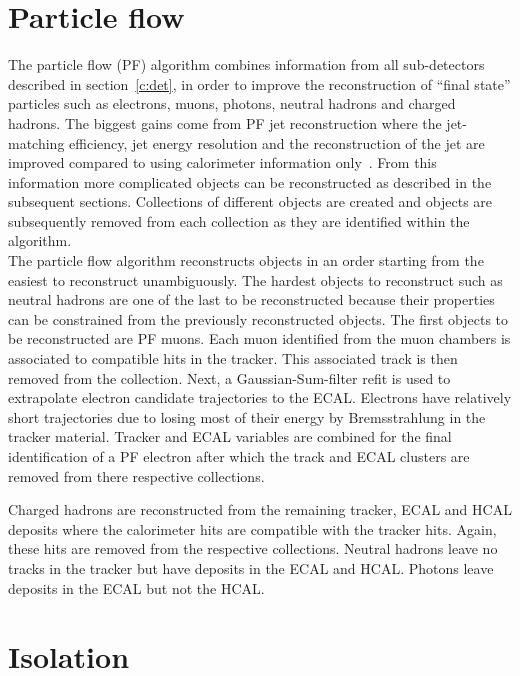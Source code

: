 \section{Particle flow ~\label{sec:PF}}

The particle flow (PF) algorithm combines information from all sub-detectors described in section~\ref{c:det}, in order to improve the reconstruction of ``final state'' particles such as electrons, muons, photons, neutral hadrons and charged hadrons. The biggest gains come from PF jet reconstruction where the jet-matching efficiency, jet energy resolution and the reconstruction of the jet \pt are improved compared to using calorimeter information only~\cite{CMS-PAS-PFT-10-001}. From this information more complicated objects can be reconstructed as described in the subsequent sections. Collections of different objects are created and objects are subsequently removed from each collection as they are identified within the algorithm.\\

The particle flow algorithm reconstructs objects in an order starting from the easiest to reconstruct unambiguously. The hardest objects to reconstruct such as neutral hadrons are one of the last to be reconstructed because their properties can be constrained from the previously reconstructed objects.
The first objects to be reconstructed are PF muons. Each muon identified from the muon chambers is associated to compatible hits in the tracker. This associated track is then removed from the collection. Next, a Gaussian-Sum-filter refit is used to extrapolate electron candidate trajectories to the ECAL. Electrons have relatively short trajectories due to losing most of their energy by Bremsstrahlung in the tracker material. Tracker and ECAL variables are combined for the final identification of a PF electron after which the track and ECAL clusters are removed from there respective collections.

Charged hadrons are reconstructed from the remaining tracker, ECAL and HCAL deposits where the calorimeter hits are compatible with the tracker hits. Again, these hits are removed from the respective collections. Neutral hadrons leave no tracks in the tracker but have deposits in the ECAL and HCAL. Photons leave deposits in the ECAL but not the HCAL.

\section{Isolation \label{sec:isolation}}

